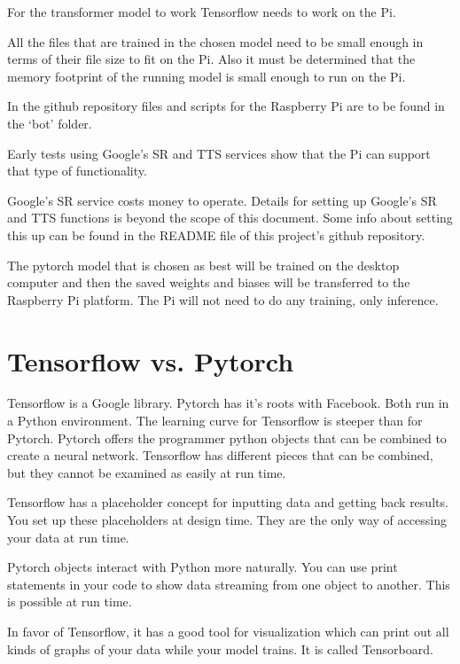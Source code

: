 For the transformer model to work Tensorflow needs to work on the Pi.

All the files that are trained in the chosen model need to be small
enough in terms of their file size to fit on the Pi. Also it must
be determined that the memory footprint of the running model is small
enough to run on the Pi.

In the github repository files and scripts for the Raspberry Pi are
to be found in the \textquoteleft bot\textquoteright{} folder.

Early tests using Google\textquoteright s SR and TTS services show
that the Pi can support that type of functionality. 

Google's SR service costs money to operate. Details
for setting up Google's SR and TTS functions is beyond
the scope of this document. Some info about setting this up can be
found in the README file of this project\textquoteright s github
repository.

The pytorch model that is chosen as best will be trained on the
desktop computer and then the saved weights and biases will be transferred
to the Raspberry Pi platform. The Pi will not need to do any training,
only inference. 



\section{Tensorflow vs. Pytorch}

Tensorflow is a Google library. Pytorch has it's roots with Facebook. Both run in a Python environment. The learning curve for Tensorflow is steeper than for Pytorch. Pytorch offers the programmer python objects that can be combined to create a neural network. Tensorflow has different pieces that can be combined, but they cannot be examined as easily at run time.

Tensorflow has a placeholder concept for inputting data and getting back results. You set up these placeholders at design time. They are the only way of accessing your data at run time.

Pytorch objects interact with Python more naturally. You can use print statements in your code to show data streaming from one object to another. This is possible at run time.

In favor of Tensorflow, it has a good tool for visualization which can print out all kinds of graphs of your data while your model trains. It is called Tensorboard.